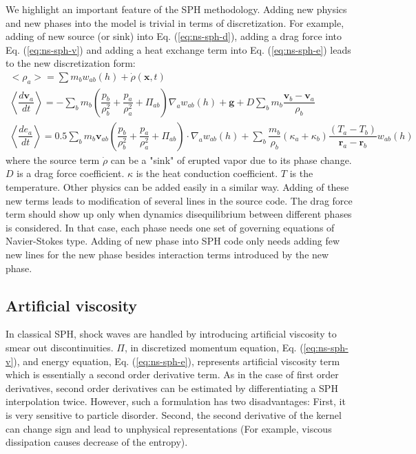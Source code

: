 \documentclass[journal abbreviation, manuscript]{copernicus}
\begin{document}
We highlight an important feature of the SPH methodology. Adding new physics and new phases into the model is trivial in terms of discretization. For example, adding of new source (or sink) into Eq. (\ref{eq:ns-sph-d}), adding a drag force into Eq. (\ref{eq:ns-sph-v})  and adding a heat exchange term into Eq. (\ref{eq:ns-sph-e}) leads to the new discretization form:
\begin{align}
<\rho_a> = \sum m_b w_{ab} \left(h\right) + \dot{\rho}\left(\textbf{x},t\right)\label{eq:ns-source-sph-d} \\
\left\langle\dfrac{d \textbf{v}_a}{d t}\right\rangle= -\sum_b m_b \left(\dfrac{p_b}{\rho_b^2} + \dfrac{p_a}{\rho_a^2} + \Pi_{ab}\right) \nabla_a w_{a b}\left(h\right) +\textbf{g} + D \sum	_b m_b \dfrac{\textbf{v}_b - \textbf{v}_a}{\rho_b} \label{eq:ns-drag-sph-v} \\
\left\langle\dfrac{d e_a}{d t}\right\rangle=
 0.5\sum_b m_b \textbf{v}_{a b}\left(\dfrac{p_b}{\rho_b^2} + \dfrac{p_a}{\rho_a^2} + \Pi_{ab}\right) \cdot \nabla_a w_{a b}\left(h\right) + \sum_b \dfrac{m_b}{\rho_b}\left(\kappa_a + \kappa_b\right) \dfrac{\left(T_a - T_b\right)}{\textbf{r}_a - \textbf{r}_b} w_{ab}\left(h\right) \label{eq:ns-conduction-sph-e}
\end{align}
where the source term $\dot{\rho}$ can be a "sink" of erupted vapor due to its phase change.
$D$ is a drag force coefficient. $\kappa$ is the heat conduction coefficient. $T$ is the temperature. Other physics can be added easily in a similar way. Adding of these new terms leads to modification of several lines in the source code. The drag force term should show up only when dynamics disequilibrium between different phases is considered. In that case, each phase needs one set of governing equations of Navier-Stokes type. Adding of new phase into SPH code only needs adding few new lines for the new phase besides interaction terms introduced by the new phase.

\subsection{Artificial viscosity} \label{sec:artificial-viscosity}
In classical SPH, shock waves are handled by introducing artificial viscosity to smear out discontinuities. $\Pi$, in discretized momentum equation, Eq. (\ref{eq:ns-sph-v}), and energy equation, Eq. (\ref{eq:ns-sph-e}), represents artificial viscosity term which is essentially a second order derivative term. As in the case of first order derivatives, second order derivatives can be estimated by differentiating a SPH interpolation twice. However, such a formulation has two disadvantages: First, it is very sensitive to particle disorder. Second, the second derivative of the kernel can change sign and lead to unphysical representations (For example, viscous dissipation causes decrease of the entropy). 
\end{document}
